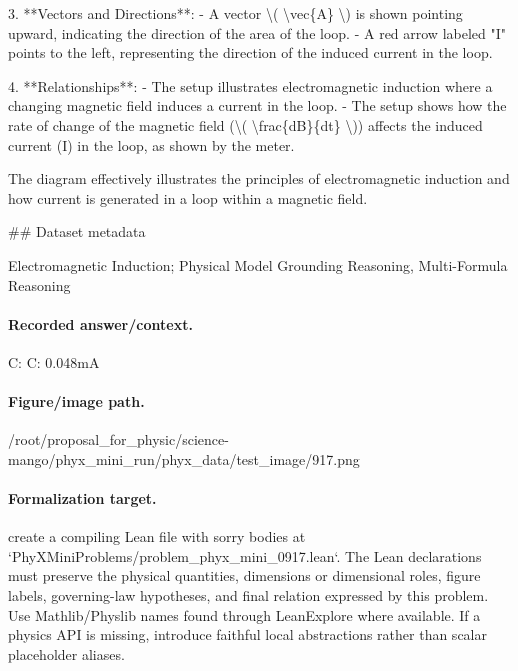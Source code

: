 3. **Vectors and Directions**:
   - A vector \textbackslash{}( \textbackslash{}vec\{A\} \textbackslash{}) is shown pointing upward, indicating the direction of the area of the loop.
   - A red arrow labeled "I" points to the left, representing the direction of the induced current in the loop.

4. **Relationships**:
   - The setup illustrates electromagnetic induction where a changing magnetic field induces a current in the loop.
   - The setup shows how the rate of change of the magnetic field (\textbackslash{}( \textbackslash{}frac\{dB\}\{dt\} \textbackslash{})) affects the induced current (I) in the loop, as shown by the meter.

The diagram effectively illustrates the principles of electromagnetic induction and how current is generated in a loop within a magnetic field.

\#\# Dataset metadata

Electromagnetic Induction; Physical Model Grounding Reasoning, Multi-Formula Reasoning

\paragraph{Recorded answer/context.}
C: C: 0.048mA

\paragraph{Figure/image path.}
/root/proposal\_for\_physic/science-mango/phyx\_mini\_run/phyx\_data/test\_image/917.png

\paragraph{Formalization target.}
create a compiling Lean file with sorry bodies at `PhyXMiniProblems/problem\_phyx\_mini\_0917.lean`. The Lean declarations must preserve the physical quantities, dimensions or dimensional roles, figure labels, governing-law hypotheses, and final relation expressed by this problem.
Use Mathlib/Physlib names found through LeanExplore where available. If a physics API is missing, introduce faithful local abstractions rather than scalar placeholder aliases.

